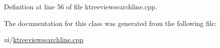 Definition at line 56 of file ktreeviewsearchline.\+cpp.



The documentation for this class was generated from the following file\+:\begin{DoxyCompactItemize}
\item 
ui/\hyperlink{ktreeviewsearchline_8cpp}{ktreeviewsearchline.\+cpp}\end{DoxyCompactItemize}
